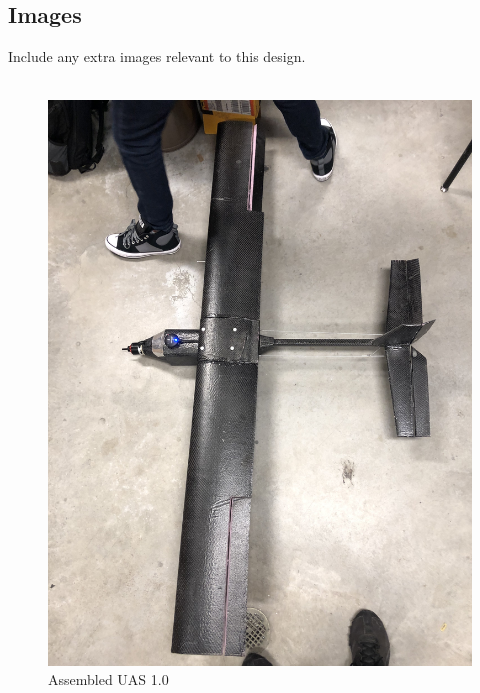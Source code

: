 \documentclass{article}
\begin{document}
\subsection*{Images}
Include any extra images relevant to this design. \\ \\

\begin{figure}[H]
	\includegraphics[width = \columnwidth]{UAS_1_0_ImageA.jpg}
	\caption{Assembled UAS 1.0}
\end{figure}

\end{document}
